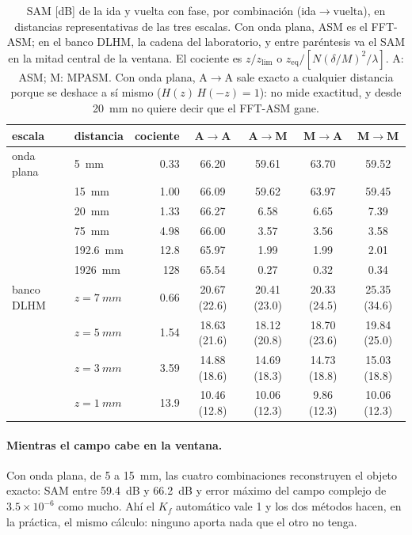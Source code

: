 \begin{table}[htbp]
  \centering
  \small
  \caption[Ida y vuelta: SAM de las cuatro combinaciones]{SAM [dB] de la ida
  y vuelta con fase, por combinación (ida$\to$vuelta), en distancias
  representativas de las tres escalas. Con onda plana, ASM es el FFT-ASM; en
  el banco DLHM, la cadena del laboratorio, y entre paréntesis va el SAM en la
  mitad central de la ventana. El cociente es $z/z_\mathrm{lim}$ o
  $z_\mathrm{eq}/[N(\delta/M)^2/\lambda]$. A: ASM; M: MPASM. Con onda plana,
  A$\to$A sale exacto a cualquier distancia porque se deshace a sí mismo
  ($H(z)\,H(-z) = 1$): no mide exactitud, y desde \SI{20}{mm} no quiere decir
  que el FFT-ASM gane.}
  \label{tab:ida-vuelta}
  \setlength{\tabcolsep}{5pt}
  \begin{tabular}{llrcccc}
    \toprule
    escala & distancia & cociente & A$\to$A & A$\to$M & M$\to$A & M$\to$M \\
    \midrule
    onda plana & \SI{5}{mm}      & 0.33  & 66.20 & 59.61 & 63.70 & 59.52 \\
               & \SI{15}{mm}     & 1.00  & 66.09 & 59.62 & 63.97 & 59.45 \\
               & \SI{20}{mm}     & 1.33  & 66.27 & 6.58  & 6.65  & 7.39 \\
               & \SI{75}{mm}     & 4.98  & 66.00 & 3.57  & 3.56  & 3.58 \\
               & \SI{192.6}{mm}  & 12.8  & 65.97 & 1.99  & 1.99  & 2.01 \\
               & \SI{1926}{mm}   & 128   & 65.54 & 0.27  & 0.32  & 0.34 \\
    \midrule
    banco DLHM & $z = \SI{7}{mm}$ & 0.66  & 20.67 (22.6) & 20.41 (23.0) & 20.33 (24.5) & 25.35 (34.6) \\
               & $z = \SI{5}{mm}$ & 1.54  & 18.63 (21.6) & 18.12 (20.8) & 18.70 (23.6) & 19.84 (25.0) \\
               & $z = \SI{3}{mm}$ & 3.59  & 14.88 (18.6) & 14.69 (18.3) & 14.73 (18.8) & 15.03 (18.8) \\
               & $z = \SI{1}{mm}$ & 13.9  & 10.46 (12.8) & 10.06 (12.3) & 9.86 (12.3)  & 10.06 (12.3) \\
    \bottomrule
  \end{tabular}
\end{table}

\paragraph{Mientras el campo cabe en la ventana.} Con onda plana, de 5 a
\SI{15}{mm}, las cuatro combinaciones reconstruyen el objeto exacto: SAM entre
\SI{59.4}{dB} y \SI{66.2}{dB} y error máximo del campo complejo de
$3.5\times10^{-6}$ como mucho. Ahí el $K_f$ automático vale 1 y los dos
métodos hacen, en la práctica, el mismo cálculo: ninguno aporta nada que el
otro no tenga.

